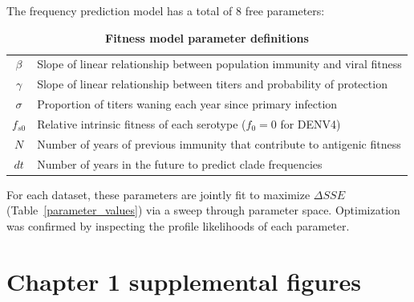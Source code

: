 The frequency prediction model has a total of 8 free parameters:
\begin{centering}
\begin{table}[ht!]
    \caption[Fitness model parameter definitions]{\textbf{Fitness model parameter definitions}}
    \begin{tabular}{c|l}
      $\beta$ & Slope of linear relationship between population immunity and viral fitness\\
      $\gamma$ & Slope of linear relationship between titers and probability of protection\\
      $\sigma$ & Proportion of titers waning each year since primary infection\\
      $f_{s0}$ & Relative intrinsic fitness of each serotype ($f_0 = 0$ for DENV4)\\
      $N$ & Number of years of previous immunity that contribute to antigenic fitness\\
      $dt$ & Number of years in the future to predict clade frequencies\\
    \end{tabular}
    \label{parameter_definition}
\end{table}
\end{centering}

For each dataset, these parameters are jointly fit to maximize $\Delta SSE$ (Table~\ref{parameter_values}) via a sweep through parameter space.
Optimization was confirmed by inspecting the profile likelihoods of each parameter.





\appendix
\raggedbottom\sloppy

\chapter{Chapter 1 supplemental figures}

